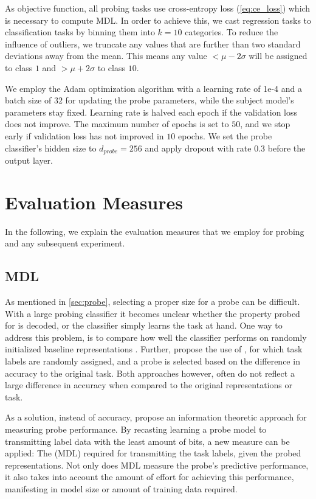 As objective function, all probing tasks use cross-entropy loss (\autoref{eq:ce_loss}) which is necessary to compute MDL. In order to achieve this, we cast regression tasks to classification tasks by binning them into $k=10$ categories. To reduce the influence of outliers, we truncate any values that are further than two standard deviations away from the mean. This means any value $< \mu - 2 \sigma$ will be assigned to class $1$ and $> \mu + 2 \sigma$ to class $10$.

We employ the Adam optimization algorithm \cite{kingma2014adam} with a learning rate of 1e-4 and a batch size of $32$ for updating the probe parameters, while the subject model's parameters stay fixed. Learning rate is halved each epoch if the validation loss does not improve. The maximum number of epochs is set to $50$, and we stop early if validation loss has not improved in $10$ epochs. We set the probe classifier's hidden size to $d_{probe}=256$ and apply dropout with rate $0.3$ before the output layer.

\section{Evaluation Measures}
\label{sec:metrics}
In the following, we explain the evaluation measures that we employ for probing and any subsequent experiment.

\subsection{MDL}
As mentioned in \autoref{sec:probe}, selecting a proper size for a probe can be difficult. With a large probing classifier it becomes unclear whether the property probed for is decoded, or the classifier simply learns the task at hand. One way to address this problem, is to compare how well the classifier performs on randomly initialized baseline representations \cite{zhang-bowman-2018-language}. Further, \cite{DBLP:journals/corr/abs-1909-03368} propose the use of , for which task labels are randomly assigned, and a probe is selected based on the difference in accuracy to the original task. Both approaches however, often do not reflect a large difference in accuracy when compared to the original representations or task.

As a solution, instead of accuracy, \cite{voita-titov-2020-information} propose an information theoretic approach for measuring probe performance. By recasting learning a probe model to transmitting label data with the least amount of bits, a new measure can be applied: The  (MDL) required for transmitting the task labels, given the probed representations. Not only does MDL measure the probe's predictive performance, it also takes into account the amount of effort for achieving this performance, manifesting in model size or amount of training data required.

